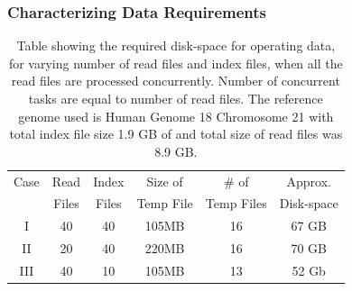 \documentclass{cpeauth}
\begin{document}
\subsubsection{Characterizing Data Requirements}




\begin{table}
 \begin{tabular}{|c|c|c|c|c|c|} 
 \hline 
Case &Read& Index& Size of&  \# of & Approx.  \\
 &Files &  Files  & Temp File & Temp Files & Disk-space\\
 \hline
I&40 & 40 &105MB & 16 &67 GB \\
II&20 & 40 & 220MB & 16 &70 GB \\
III&40 & 10 & 105MB & 13 &52 Gb \\ 
 \hline
 \end{tabular}

 \caption{Table showing the required disk-space for operating data,
   for varying number of read files and index files, when all the read
   files are processed concurrently.  Number of concurrent tasks are
   equal to number of read files. The reference genome used is Human
   Genome 18 Chromosome 21 with total index file size 1.9 GB of and
   total size of read files was 8.9 GB.}
    \label{table:dynamic-diskspace} 
\end{table}


\end{document}

